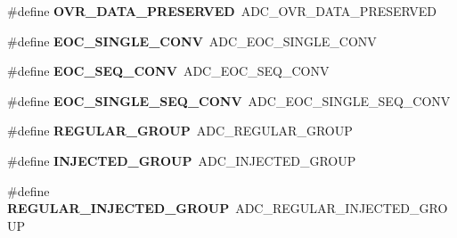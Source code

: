 \begin{DoxyCompactItemize}
\item 
\hypertarget{group___h_a_l___a_d_c___aliased___defines_ga1fb9c5eb49053187ac90c0af92662be6}{\#define {\bfseries O\-V\-R\-\_\-\-D\-A\-T\-A\-\_\-\-P\-R\-E\-S\-E\-R\-V\-E\-D}~A\-D\-C\-\_\-\-O\-V\-R\-\_\-\-D\-A\-T\-A\-\_\-\-P\-R\-E\-S\-E\-R\-V\-E\-D}\label{group___h_a_l___a_d_c___aliased___defines_ga1fb9c5eb49053187ac90c0af92662be6}

\item 
\hypertarget{group___h_a_l___a_d_c___aliased___defines_ga8160cf13a85d797ef96972174a863945}{\#define {\bfseries E\-O\-C\-\_\-\-S\-I\-N\-G\-L\-E\-\_\-\-C\-O\-N\-V}~A\-D\-C\-\_\-\-E\-O\-C\-\_\-\-S\-I\-N\-G\-L\-E\-\_\-\-C\-O\-N\-V}\label{group___h_a_l___a_d_c___aliased___defines_ga8160cf13a85d797ef96972174a863945}

\item 
\hypertarget{group___h_a_l___a_d_c___aliased___defines_gac7022f73c8906a37c7faf511bc720dda}{\#define {\bfseries E\-O\-C\-\_\-\-S\-E\-Q\-\_\-\-C\-O\-N\-V}~A\-D\-C\-\_\-\-E\-O\-C\-\_\-\-S\-E\-Q\-\_\-\-C\-O\-N\-V}\label{group___h_a_l___a_d_c___aliased___defines_gac7022f73c8906a37c7faf511bc720dda}

\item 
\hypertarget{group___h_a_l___a_d_c___aliased___defines_ga503236c97697e9135a9d1c2c88cac7c9}{\#define {\bfseries E\-O\-C\-\_\-\-S\-I\-N\-G\-L\-E\-\_\-\-S\-E\-Q\-\_\-\-C\-O\-N\-V}~A\-D\-C\-\_\-\-E\-O\-C\-\_\-\-S\-I\-N\-G\-L\-E\-\_\-\-S\-E\-Q\-\_\-\-C\-O\-N\-V}\label{group___h_a_l___a_d_c___aliased___defines_ga503236c97697e9135a9d1c2c88cac7c9}

\item 
\hypertarget{group___h_a_l___a_d_c___aliased___defines_ga37bac62f24a8600f62d0d35683a0a4de}{\#define {\bfseries R\-E\-G\-U\-L\-A\-R\-\_\-\-G\-R\-O\-U\-P}~A\-D\-C\-\_\-\-R\-E\-G\-U\-L\-A\-R\-\_\-\-G\-R\-O\-U\-P}\label{group___h_a_l___a_d_c___aliased___defines_ga37bac62f24a8600f62d0d35683a0a4de}

\item 
\hypertarget{group___h_a_l___a_d_c___aliased___defines_gaa5d1cfe7b35cb724d898622cbd6b7894}{\#define {\bfseries I\-N\-J\-E\-C\-T\-E\-D\-\_\-\-G\-R\-O\-U\-P}~A\-D\-C\-\_\-\-I\-N\-J\-E\-C\-T\-E\-D\-\_\-\-G\-R\-O\-U\-P}\label{group___h_a_l___a_d_c___aliased___defines_gaa5d1cfe7b35cb724d898622cbd6b7894}

\item 
\hypertarget{group___h_a_l___a_d_c___aliased___defines_ga1e691aaec563e444d3965d5d98d1c47b}{\#define {\bfseries R\-E\-G\-U\-L\-A\-R\-\_\-\-I\-N\-J\-E\-C\-T\-E\-D\-\_\-\-G\-R\-O\-U\-P}~A\-D\-C\-\_\-\-R\-E\-G\-U\-L\-A\-R\-\_\-\-I\-N\-J\-E\-C\-T\-E\-D\-\_\-\-G\-R\-O\-U\-P}\label{group___h_a_l___a_d_c___aliased___defines_ga1e691aaec563e444d3965d5d98d1c47b}


\end{DoxyCompactItemize}
